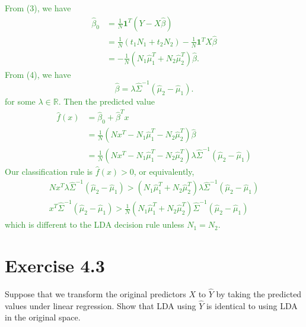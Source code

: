 \documentclass{article}
\begin{document}
\begin{enumerate}[(a)]
    \textcolor{ForestGreen}{
    From (3), we have \begin{align*}
            \hat \beta_0 &= \frac{1}{N} \mathbf{1}^T (Y - X \hat \beta) \\
            &= \frac{1}{N}(t_1 N_1 + t_2 N_2)  - \frac{1}{N} \mathbf{1}{^T} X \hat \beta \\
            &= -\frac{1}{N}(N_1 \hat \mu_1^T + N_2 \hat \mu_2^T) \hat \beta.
        \end{align*}
        From (4), we have \[
                    \hat \beta = \lambda \hat \Sigma^{-1} (\hat \mu_2 - \hat \mu_1).
                    \]
        for some $\lambda \in \mathbb{R}$.
      Then the predicted value \begin{align*}
            \hat f(x) &= \hat \beta_0 + \hat \beta^T x \\
            &= \frac{1}{N}\left( N x^T - N_1 \hat \mu_1^T - N_2 \hat \mu_2^T \right) \hat \beta \\
            &=  \frac{1}{N}\left( N x^T - N_1 \hat \mu_1^T - N_2 \hat \mu_2^T \right) \lambda \hat \Sigma^{-1} (\hat \mu_2 - \hat \mu_1)
        \end{align*}
        Our classification rule is $\hat f(x) > 0$, or equivalently, \begin{align*}
            N x^T \lambda \hat \Sigma^{-1} (\hat \mu_2 - \hat \mu_1) > (N_1 \hat \mu_1^T + N_2 \hat \mu_2^T) \lambda \hat \Sigma^{-1}(\hat \mu_2 - \hat \mu_1) \\
            x^T \hat \Sigma^{-1} (\hat \mu_2 - \hat \mu_1) > \frac{1}{N} \left( N_1 \hat \mu^T_1 + N_2 \hat \mu_2^T \right) \hat \Sigma^{-1} (\hat \mu_2 - \hat \mu_1)
        \end{align*} which is different to the LDA decision rule unless $N_1 = N_2$.
        }

\end{enumerate}

\section{Exercise 4.3}

Suppose that we transform the original predictors $X$ to $\hat Y$ by taking the predicted values under linear regression.  Show that LDA using $\hat Y$ is identical to using LDA in the original space.
\end{document}
